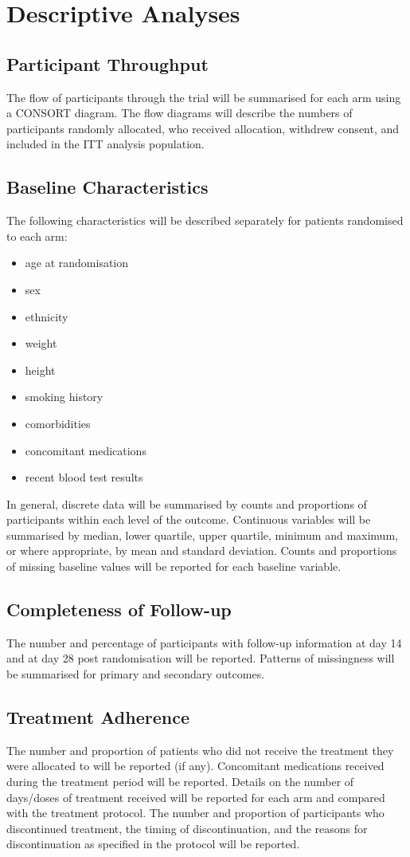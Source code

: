 \documentclass[11pt,parskip=half-]{scrartcl}
\begin{document}
\section{Descriptive Analyses}

\subsection{Participant Throughput}
The flow of participants through the trial will be summarised for each arm using a CONSORT diagram. The flow diagrams will describe the numbers of participants randomly allocated, who received allocation, withdrew consent, and included in the ITT analysis population.

\subsection{Baseline Characteristics}
The following characteristics will be described separately for patients randomised to each arm:
\begin{itemize}
    \item age at randomisation
    \item sex
    \item ethnicity
    \item weight
    \item height
    \item smoking history
    \item comorbidities
    \item concomitant medications
    \item recent blood test results
\end{itemize}
In general, discrete data will be summarised by counts and proportions of participants within each level of the outcome. Continuous variables will be summarised by median, lower quartile, upper quartile, minimum and maximum, or where appropriate, by mean and standard deviation. Counts and proportions of missing baseline values will be reported for each baseline variable.

\subsection{Completeness of Follow-up}
The number and percentage of participants with follow-up information at day 14 and at day 28 post randomisation will be reported. Patterns of missingness will be summarised for primary and secondary outcomes.

\subsection{Treatment Adherence}
The number and proportion of patients who did not receive the treatment they were allocated to will be reported (if any). Concomitant medications received during the treatment period will be reported. Details on the number of days/doses of treatment received will be reported for each arm and compared with the treatment protocol. The number and proportion of participants who discontinued treatment, the timing of discontinuation, and the reasons for discontinuation as specified in the protocol will be reported.
\end{document}
